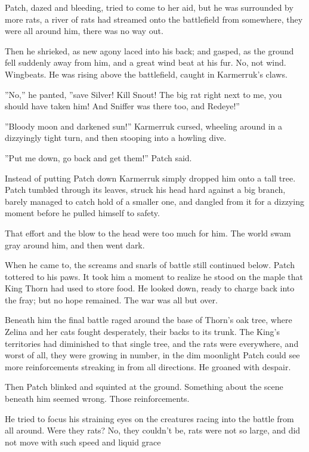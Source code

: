 \documentclass[12pt]{book}
\begin{document}
Patch, dazed and bleeding, tried to come to her aid, but he was surrounded by more rats, a river of rats had streamed onto the battlefield from somewhere, they were all around him, there was no way out.

Then he shrieked, as new agony laced into his back; and gasped, as the ground fell suddenly away from him, and a great wind beat at his fur. No, not wind. Wingbeats. He was rising above the battlefield, caught in Karmerruk's claws.

''No,'' he panted, ''save Silver! Kill Snout! The big rat right next to me, you should have taken him! And Sniffer was there too, and Redeye!''

''Bloody moon and darkened sun!'' Karmerruk cursed, wheeling around in a dizzyingly tight turn, and then stooping into a howling dive.

''Put me down, go back and get them!'' Patch said.

Instead of putting Patch down Karmerruk simply dropped him onto a tall tree. Patch tumbled through its leaves, struck his head hard against a big branch, barely managed to catch hold of a smaller one, and dangled from it for a dizzying moment before he pulled himself to safety.

That effort and the blow to the head were too much for him. The world swam gray around him, and then went dark.

When he came to, the screams and snarls of battle still continued below. Patch tottered to his paws. It took him a moment to realize he stood on the maple that King Thorn had used to store food. He looked down, ready to charge back into the fray; but no hope remained. The war was all but over.

Beneath him the final battle raged around the base of Thorn's oak tree, where Zelina and her cats fought desperately, their backs to its trunk. The King's territories had diminished to that single tree, and the rats were everywhere, and worst of all, they were growing in number, in the dim moonlight Patch could see more reinforcements streaking in from all directions. He groaned with despair.

Then Patch blinked and squinted at the ground. Something about the scene beneath him seemed wrong. Those reinforcements.

He tried to focus his straining eyes on the creatures racing into the battle from all around. Were they rats? No, they couldn't be, rats were not so large, and did not move with such speed and liquid grace %
\end{document}
